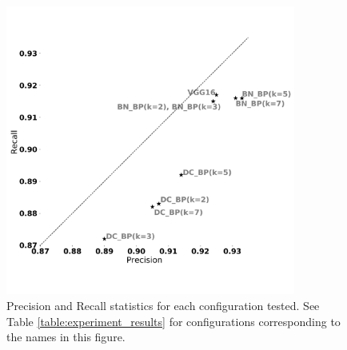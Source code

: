 \begin{figure}[ht]
	\centering
	\includegraphics[width=0.85\textwidth]{./thesis_code/plots/precision_recall_curve_all_configs_bw.png}
	\caption{Precision and Recall statistics for each configuration tested. See Table \ref{table:experiment_results} for configurations corresponding to the names in this figure.}
	\label{fig:bestmodel_precision_recall_curves}
\end{figure}

